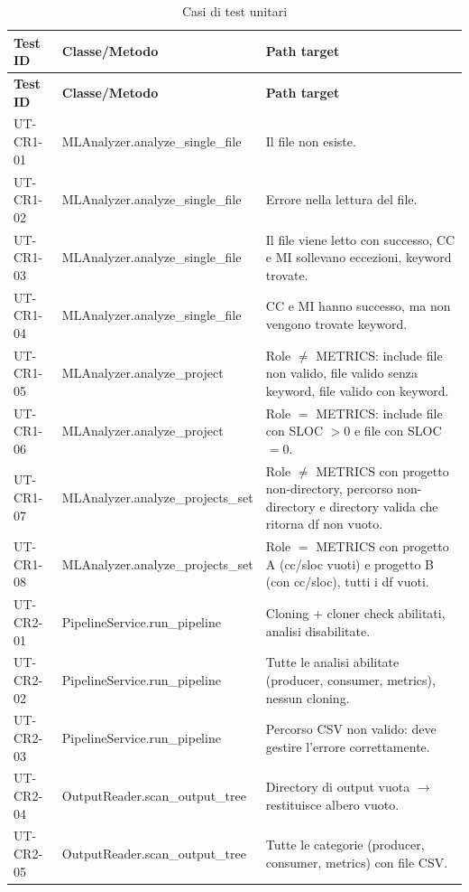 \documentclass[11pt,a4paper]{article}
\makeatletter
\newif\ifmark@prevlower
\def\mark@casebreak#1{%
  \ifcat\noexpand#1\relax
    \mark@prevlowerfalse
  \else
    \ifnum`#1=\uccode`#1\relax
      \ifmark@prevlower\allowbreak\fi
      \mark@prevlowerfalse
    \else
      \ifnum`#1=\lccode`#1\relax
        \mark@prevlowertrue
      \else
        \mark@prevlowerfalse
      \fi
    \fi
  \fi}
\def\mark@brk#1{%
  \ifx#1\mark@stop
    \let\mark@next\relax
  \else
    \mark@casebreak{#1}%
    #1%
    \ifx#1.\allowbreak\else
      \ifx#1\_\allowbreak\else
        \ifx#1/\allowbreak\else
          \ifx#1(\allowbreak\fi
        \fi
      \fi
    \fi
    \let\mark@next\mark@brk
  \fi
  \mark@next}
\def\mark@stop{\mark@stop}
\DeclareRobustCommand{\mark@code}[1]{%
  \ifmmode
    \text{\ttfamily\small\mark@prevlowerfalse\mark@brk#1\mark@stop}%
  \else
    {\ttfamily\small\mark@prevlowerfalse\mark@brk#1\mark@stop}%
  \fi}
\DeclareRobustCommand{\code}[1]{\mark@code{#1}}
\DeclareRobustCommand{\meth}[1]{\mark@code{#1}}
\def\mark@code#1{#1}%
\def\code#1{#1}%
\def\meth#1{#1}%
\newcommand{\thead}[1]{\textbf{#1}}
\makeatother
\begin{document}
\begin{longtable}{@{}L{2.5cm} L{5.2cm} L{7.2cm}@{}}
  \caption{Casi di test unitari}\label{tab:ut}\\
  \toprule
  \thead{Test ID} & \thead{Classe/Metodo} & \thead{Path target}\\
  \midrule
  \endfirsthead
  \toprule
  \thead{Test ID} & \thead{Classe/Metodo} & \thead{Path target}\\
  \midrule
  \endhead
  \bottomrule
  \endfoot
  UT-CR1-01 & \meth{MLAnalyzer.analyze\_single\_file} & Il file non esiste.\\
  UT-CR1-02 & \meth{MLAnalyzer.analyze\_single\_file} & Errore nella lettura del file.\\
  UT-CR1-03 & \meth{MLAnalyzer.analyze\_single\_file} &
    Il file viene letto con successo, CC e MI sollevano eccezioni, keyword trovate.\\
  UT-CR1-04 & \meth{MLAnalyzer.analyze\_single\_file} &
    CC e MI hanno successo, ma non vengono trovate keyword.\\
  UT-CR1-05 & \meth{MLAnalyzer.analyze\_project} &
    Role $\neq$ METRICS: include file non valido, file valido senza keyword,
    file valido con keyword.\\
  UT-CR1-06 & \meth{MLAnalyzer.analyze\_project} &
    Role $=$ METRICS: include file con SLOC $>0$ e file con SLOC $=0$.\\
  UT-CR1-07 & \meth{MLAnalyzer.analyze\_projects\_set} &
    Role $\neq$ METRICS con progetto non-directory, percorso non-directory e
    directory valida che ritorna \code{df} non vuoto.\\
  UT-CR1-08 & \meth{MLAnalyzer.analyze\_projects\_set} &
    Role $=$ METRICS con progetto A (cc/sloc vuoti) e progetto B (con cc/sloc),
    tutti i \code{df} vuoti.\\
  UT-CR2-01 & \meth{PipelineService.run\_pipeline} &
    Cloning + cloner check abilitati, analisi disabilitate.\\
  UT-CR2-02 & \meth{PipelineService.run\_pipeline} &
    Tutte le analisi abilitate (producer, consumer, metrics), nessun cloning.\\
  UT-CR2-03 & \meth{PipelineService.run\_pipeline} &
    Percorso CSV non valido: deve gestire l'errore correttamente.\\
  UT-CR2-04 & \meth{OutputReader.scan\_output\_tree} &
    Directory di output vuota $\rightarrow$ restituisce albero vuoto.\\
  UT-CR2-05 & \meth{OutputReader.scan\_output\_tree} &
    Tutte le categorie (producer, consumer, metrics) con file CSV.\\

\end{longtable}
\end{document}
